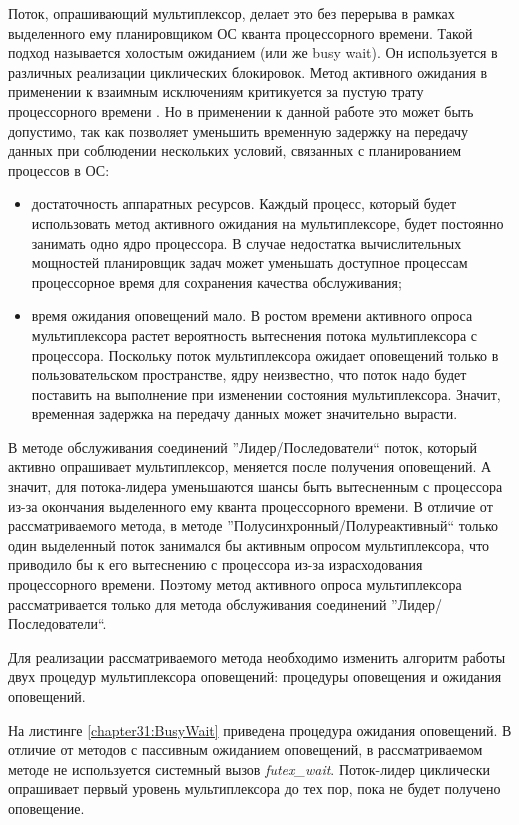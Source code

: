 Поток, опрашивающий мультиплексор, делает это без перерыва в рамках выделенного ему планировщиком ОС кванта процессорного времени. Такой подход называется холостым ожиданием (или же busy wait). Он используется в различных реализации циклических блокировок. Метод активного ожидания в применении к взаимным исключениям критикуется за пустую трату процессорного времени \cite{10.1007/3-540-44947-7_10, Ganjaliyev2019}. Но в применении к данной работе это может быть допустимо, так как позволяет уменьшить временную задержку на передачу данных при соблюдении нескольких условий, связанных с планированием процессов в ОС:
\begin{itemize}
\item достаточность аппаратных ресурсов. Каждый процесс, который будет использовать метод активного ожидания на мультиплексоре, будет постоянно занимать одно ядро процессора. В случае недостатка вычислительных мощностей планировщик задач может уменьшать доступное процессам процессорное время для сохранения качества обслуживания;
\item время ожидания оповещений мало. В ростом времени активного опроса мультиплексора растет вероятность вытеснения потока мультиплексора с процессора. Поскольку поток мультиплексора ожидает оповещений только в пользовательском пространстве, ядру неизвестно, что поток надо будет поставить на выполнение при изменении состояния мультиплексора. Значит, временная задержка на передачу данных может значительно вырасти.
\end{itemize}

В методе обслуживания соединений ''Лидер/Последователи`` поток, который активно опрашивает мультиплексор, меняется после получения оповещений. А значит, для потока-лидера уменьшаются шансы быть вытесненным с процессора из-за окончания выделенного ему кванта процессорного времени. В отличие от рассматриваемого метода, в методе ''Полусинхронный/Полуреактивный`` только один выделенный поток занимался бы активным опросом мультиплексора, что приводило бы к его вытеснению с процессора из-за израсходования процессорного времени. Поэтому метод активного опроса мультиплексора рассматривается только для метода обслуживания соединений ''Лидер/Последователи``.

Для реализации рассматриваемого метода необходимо изменить алгоритм работы двух процедур мультиплексора оповещений: процедуры оповещения и ожидания оповещений.

На листинге \ref{chapter31:BusyWait} приведена процедура ожидания оповещений. В отличие от методов с пассивным ожиданием оповещений, в рассматриваемом методе не используется системный вызов \textit{futex\_wait}. Поток-лидер циклически опрашивает первый уровень мультиплексора до тех пор, пока не будет получено оповещение.

